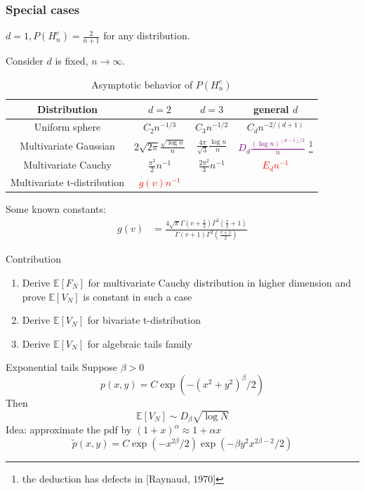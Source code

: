 \documentclass{beamer}
\def\E{\mathbb{E}}
\begin{document}
\begin{frame}
    \frametitle{Special cases}
    $d=1,P(H_n^c) = \frac{2}{n+1}$ for any distribution.
    
    Consider $d$ is fixed, $n\to \infty$.
    \begin{table}
        \begin{tabular}{|c|c|c|c|}
            \hline
            Distribution & $d=2$ & $d=3$ &  general $d$ \\
            \hline
            Uniform sphere & $C_2 n^{-1/3}$ & $C_3 n^{-1/2}$ &
            $C_{d} n^{-2/(d+1)}$ \\
            \hline
            Multivariate Gaussian &
            $2\sqrt{2\pi}\frac{\sqrt{\log n}}{n}$
            & $\frac{4\pi}{\sqrt{3}}\frac{\log n}{n}$
            & 
            \textcolor{purple}
            {$D_d\frac{(\log n)^{(d-1)/2}}{n}$}
            \footnote{the deduction has defects
            in [Raynaud, 1970]} \\
            \hline
            Multivariate Cauchy & 
            $\frac{\pi^2}{2}n^{-1}$ &
            $\frac{2\pi^2}{3}n^{-1}$ &
            \textcolor{red}{$E_d n^{-1}$}\\
            \hline
            Multivariate t-distribution &
            \textcolor{red}{$g(v) n^{-1}$} & & \\
            \hline
        \end{tabular}
        \caption{Asymptotic behavior of $P(H_n^c)$}
    \end{table}
    Some known constants:
    \begin{align*}
    g(v) &= \frac{4\sqrt{\pi}
    \Gamma(v+\frac{1}{2})\Gamma^2\left(\frac{v}{2}+1\right)}
    {\Gamma(v+1)\Gamma^2 \left(\frac{v+1}{2} \right)}
    \end{align*}
\end{frame}
\begin{frame}{Contribution}
    \begin{enumerate}
        \item Derive $\E[F_N]$ for multivariate Cauchy distribution in higher dimension
        and prove $\E[V_N]$ is constant in such a case
        \item Derive $\E[V_N]$ for bivariate t-distribution
        \item Derive $\E[V_N]$ for algebraic tails family
    \end{enumerate}
\end{frame}
\begin{frame}{Exponential tails}
    Suppose $\beta > 0$
\begin{equation*}
    p(x,y) = C  \exp(-(x^2+y^2)^{\beta}/2)    
\end{equation*}
Then 
\begin{equation*}
    \E[V_N] \sim D_{\beta} \sqrt{\log N
    }
    \end{equation*}
Idea: approximate the pdf by
$(1+x)^{\alpha} \approx 1+\alpha x$
\begin{equation*}
    \tilde{p}(x,y)=
    C \exp(-x^{2\beta}/2) \exp(-\beta y^2 x^{2\beta-2}/2)
\end{equation*}
\end{frame}
\end{document}
